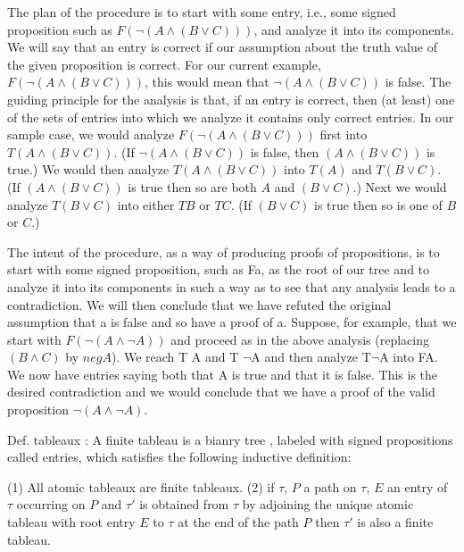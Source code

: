 \documentclass[a4paper, 10pt]{ctexbook} %
\begin{document}
The plan of the procedure is to start with some entry, i.e.,
some signed proposition such as $F \left(\neg \left(A \wedge \left(B \vee C\right)\right)\right)$, and analyze it into
its components. We will say that an entry is correct if our assumption
about the truth value of the given proposition is correct. For our current
example, $F \left(\neg \left(A \wedge \left(B \vee C\right)\right)\right)$, this would mean that $\neg \left(A \wedge \left(B \vee C\right)\right)$ is false.
The guiding principle for the analysis is that, if an entry is correct, then
(at least) one of the sets of entries into which we analyze it contains only
correct entries. In our sample case, we would analyze $F \left(\neg \left(A \wedge \left(B \vee C\right)\right)\right)$
first into $T \left(A \wedge \left(B \vee C\right)\right)$. (If $\neg \left(A \wedge \left(B \vee C\right)\right)$ is false, then $\left(A \wedge \left(B \vee C\right)\right)$ 
is true.) We would then analyze $T \left(A \wedge \left(B \vee C\right)\right)$ into $T \left(A\right)$ and $T\left(B \vee C\right)$.
(If $\left(A \wedge \left(B \vee C\right)\right)$ is true then so are both $A$ and $(B \vee C)$.) Next we would
analyze $T(B\vee  C)$ into either $TB$ or $TC$. (If $\left(B \vee C\right)$ is true then so is one
of $B$ or $C$.)

The intent of the procedure, as a way of producing proofs of propositions,
is to start with some signed proposition, such as Fa, as the root of our
tree and to analyze it into its components in such a way as to see that
any analysis leads to a contradiction. We will then conclude that we have
refuted the original assumption that a is false and so have a proof of a.
Suppose, for example, that we start with $F\left(\neg \left(A \wedge \neg A\right)\right)$ and proceed as
in the above analysis (replacing $\left(B \wedge C\right)$ by $neg A$). We reach T A and T $\neg$A
and then analyze T$\neg$A into FA. We now have entries saying both that A
is true and that it is false. This is the desired contradiction and we would
conclude that we have a proof of the valid proposition $\neg \left(A \wedge \neg A\right)$.


Def. tableaux : A finite tableau is a bianry tree , labeled with signed propositions called entries, which satisfies the following inductive definition:

(1) All atomic tableaux are finite tableaux.
(2) if $\tau     $, $P$ a path on $\tau $, $E$ an entry of $\tau$ occurring on $P$ and $\tau'$ is obtained from $\tau$ by adjoining the unique atomic tableau with root entry $E$ to $\tau$ at the end of the path $P$ then $\tau'$ is also a finite tableau. 
\end{document}
